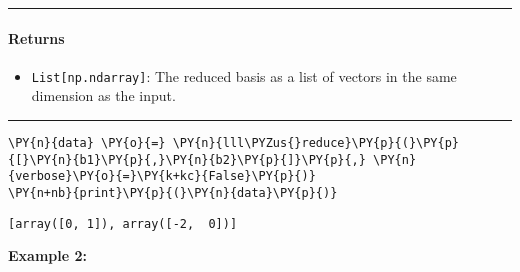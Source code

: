 \documentclass[a4paper,12pt]{article}
\begin{document}
\begin{tcolorbox}[
    width=\linewidth,       
    left=10mm, right=10mm,
    top=1mm, bottom=1mm,
    breakable,
]
\begin{center}\rule{0.5\linewidth}{0.5pt}\end{center}

\paragraph{ Returns}\label{returns}

\begin{itemize}
\tightlist
\item
  \texttt{List{[}np.ndarray{]}}: The reduced basis as a list of vectors
  in the same dimension as the input.
\end{itemize}

\begin{center}\rule{0.5\linewidth}{0.5pt}\end{center}

    \begin{tcolorbox}[breakable, size=fbox, boxrule=1pt, pad at break*=1mm,colback=cellbackground, colframe=cellborder]
\begin{Verbatim}[commandchars=\\\{\}]
\PY{n}{data} \PY{o}{=} \PY{n}{lll\PYZus{}reduce}\PY{p}{(}\PY{p}{[}\PY{n}{b1}\PY{p}{,}\PY{n}{b2}\PY{p}{]}\PY{p}{,} \PY{n}{verbose}\PY{o}{=}\PY{k+kc}{False}\PY{p}{)}
\PY{n+nb}{print}\PY{p}{(}\PY{n}{data}\PY{p}{)}
\end{Verbatim}
\end{tcolorbox}

    \begin{Verbatim}[commandchars=\\\{\}]
[array([0, 1]), array([-2,  0])]
    \end{Verbatim}




\end{tcolorbox}








\newpage
\textbf{Example 2:} 
\end{document}
